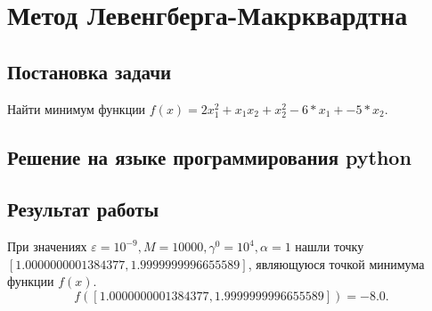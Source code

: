 \documentclass[12pt,a4paper,oneside]{extarticle}
\begin{document}
\section{Метод Левенгберга-Макрквардтна}
    \subsection{Постановка задачи}
        Найти минимум функции $f(x) = 2x_1^2 + x_1x_2 + x_2^2 - 6*x_1 + -5*x_2$. 

    \subsection{Решение на языке программирования python}
        

    \subsection{Результат работы}
        При значениях $\varepsilon=10^{-9}, M = 10000, \gamma^0 = 10^4, \alpha = 1$
    нашли точку $[1.0000000001384377, 1.9999999996655589]$, являющуюся точкой минимума функции $f(x)$. 
    $$f([1.0000000001384377, 1.9999999996655589]) = -8.0.$$
\end{document}
